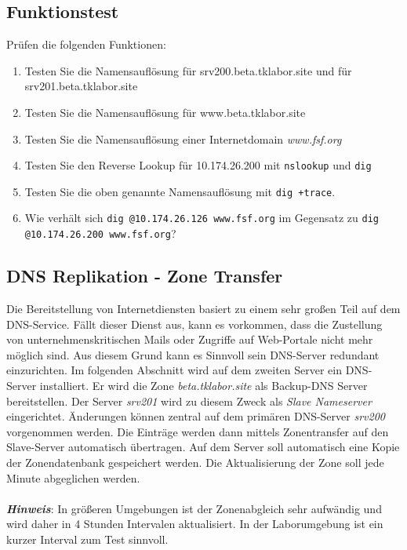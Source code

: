 \subsection{Funktionstest}
Prüfen die folgenden Funktionen:
\begin{enumerate}
  \item Testen Sie die Namensauflösung für srv200.beta.tklabor.site und für
  srv201.beta.tklabor.site
  \item Testen Sie die Namensauflösung für www.beta.tklabor.site
  \item Testen Sie die Namensauflösung einer Internetdomain \textit{www.fsf.org}
  \item Testen Sie den Reverse Lookup für 10.174.26.200 mit \texttt{nslookup}
  und \texttt{dig}
  \item Testen Sie die oben genannte Namensauflösung mit \texttt{dig +trace}.
  \item Wie verhält sich \texttt{dig @10.174.26.126 www.fsf.org} im Gegensatz
  zu \texttt{dig @10.174.26.200 www.fsf.org}?
\end{enumerate}

\subsection{DNS Replikation - Zone Transfer}
Die Bereitstellung von Internetdiensten basiert zu einem sehr großen Teil auf
dem DNS-Service. Fällt dieser Dienst aus, kann es vorkommen, dass die Zustellung
von unternehmenskritischen Mails oder Zugriffe auf Web-Portale nicht mehr
möglich sind. Aus diesem Grund kann es Sinnvoll sein DNS-Server redundant
einzurichten. Im folgenden Abschnitt wird auf dem zweiten Server ein DNS-Server
installiert. Er wird die Zone \textit{beta.tklabor.site} als Backup-DNS Server
bereitstellen. Der Server \textit{srv201} wird zu diesem Zweck als \textit{Slave
Nameserver} eingerichtet. Änderungen können zentral auf dem primären DNS-Server
\textit{srv200} vorgenommen werden. Die Einträge werden dann mittels
Zonentransfer auf den Slave-Server automatisch übertragen. Auf dem Server soll
automatisch eine Kopie der Zonendatenbank gespeichert werden. Die Aktualisierung
der Zone soll jede Minute abgeglichen werden.\\
\\
\textbf{\textit{Hinweis}}: In größeren Umgebungen ist der Zonenabgleich sehr
aufwändig und wird daher in 4 Stunden Intervalen aktualisiert. In der
Laborumgebung ist ein kurzer Interval zum Test sinnvoll.


